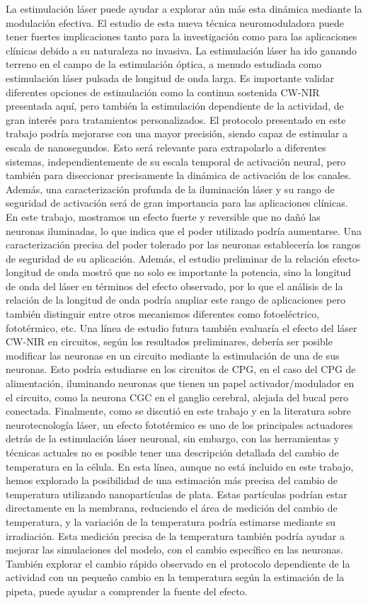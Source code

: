 La estimulación láser puede ayudar a explorar aún más esta dinámica mediante la modulación efectiva. El estudio de esta nueva técnica neuromoduladora puede tener fuertes implicaciones tanto para la investigación como para las aplicaciones clínicas debido a su naturaleza no invasiva. La estimulación láser ha ido ganando terreno en el campo de la estimulación óptica, a menudo estudiada como estimulación láser pulsada de longitud de onda larga. Es importante validar diferentes opciones de estimulación como la continua sostenida CW-NIR presentada aquí, pero también la estimulación dependiente de la actividad, de gran interés para tratamientos personalizados. El protocolo presentado en este trabajo podría mejorarse con una mayor precisión, siendo capaz de estimular a escala de nanosegundos. Esto será relevante para extrapolarlo a diferentes sistemas, independientemente de su escala temporal de activación neural, pero también para diseccionar precisamente la dinámica de activación de los canales. Además, una caracterización profunda de la iluminación láser y su rango de seguridad de activación será de gran importancia para las aplicaciones clínicas. En este trabajo, mostramos un efecto fuerte y reversible que no dañó las neuronas iluminadas, lo que indica que el poder utilizado podría aumentarse. Una caracterización precisa del poder tolerado por las neuronas establecería los rangos de seguridad de su aplicación. Además, el estudio preliminar de la relación efecto-longitud de onda mostró que no solo es importante la potencia, sino la longitud de onda del láser en términos del efecto observado, por lo que el análisis de la relación de la longitud de onda podría ampliar este rango de aplicaciones pero también distinguir entre otros mecanismos diferentes como fotoeléctrico, fototérmico, etc. Una línea de estudio futura también evaluaría el efecto del láser CW-NIR en circuitos, según los resultados preliminares, debería ser posible modificar las neuronas en un circuito mediante la estimulación de una de sus neuronas. Esto podría estudiarse en los circuitos de CPG, en el caso del CPG de alimentación, iluminando neuronas que tienen un papel activador/modulador en el circuito, como la neurona CGC en el ganglio cerebral, alejada del bucal pero conectada. Finalmente, como se discutió en este trabajo y en la literatura sobre neurotecnología láser, un efecto fototérmico es uno de los principales actuadores detrás de la estimulación láser neuronal, sin embargo, con las herramientas y técnicas actuales no es posible tener una descripción detallada del cambio de temperatura en la célula. En esta línea, aunque no está incluido en este trabajo, hemos explorado la posibilidad de una estimación más precisa del cambio de temperatura utilizando nanopartículas de plata. Estas partículas podrían estar directamente en la membrana, reduciendo el área de medición del cambio de temperatura, y la variación de la temperatura podría estimarse mediante su irradiación. Esta medición precisa de la temperatura también podría ayudar a mejorar las simulaciones del modelo, con el cambio específico en las neuronas. También explorar el cambio rápido observado en el protocolo dependiente de la actividad con un pequeño cambio en la temperatura según la estimación de la pipeta, puede ayudar a comprender la fuente del efecto.

